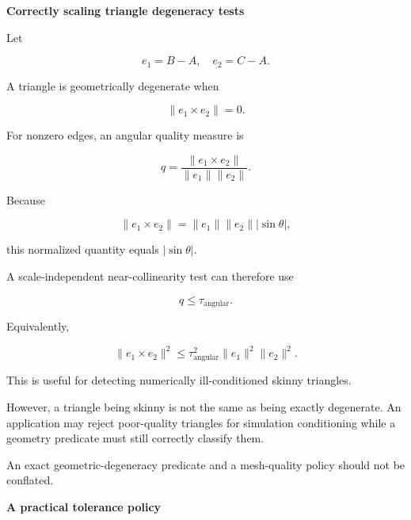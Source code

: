 \textbf{Correctly scaling triangle degeneracy tests}

Let

\[
e_1=B-A,\quad e_2=C-A.
\]

A triangle is geometrically degenerate when

\[
\|e_1\times e_2\|=0.
\]

For nonzero edges, an angular quality measure is

\[
q=\frac{\|e_1\times e_2\|} {\|e_1\|\|e_2\|}.
\]

Because

\[
\|e_1\times e_2\| =\|e_1\|\|e_2\||\sin\theta|,
\]

this normalized quantity equals \(|\sin\theta|\).

A scale-independent near-collinearity test can therefore use

\[
q\le\tau_{\text{angular}}.
\]

Equivalently,

\[
\|e_1\times e_2\|^2 \le \tau_{\text{angular}}^2 \|e_1\|^2\|e_2\|^2.
\]

This is useful for detecting numerically ill-conditioned skinny triangles.

However, a triangle being skinny is not the same as being exactly degenerate. An application may reject poor-quality triangles for simulation conditioning while a geometry predicate must still correctly classify them.

An exact geometric-degeneracy predicate and a mesh-quality policy should not be conflated.

\textbf{A practical tolerance policy}

